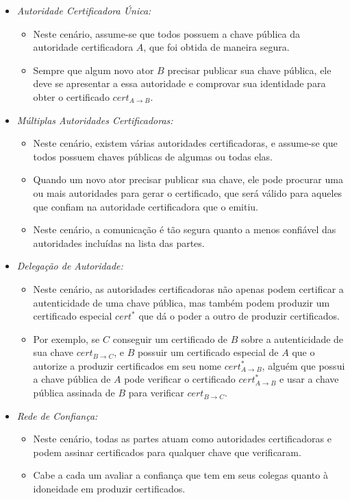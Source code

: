 \begin{itemize}
\item {\em Autoridade Certificadora Única:}
  \begin{itemize}
  \item Neste cenário, assume-se que todos possuem a chave pública da autoridade certificadora $A$, que foi obtida de maneira segura.
  \item Sempre que algum novo ator $B$ precisar publicar sua chave pública, ele deve se apresentar a essa autoridade e comprovar sua identidade para obter o certificado $cert_{A \to B}$.
  \end{itemize}
    
\item {\em Múltiplas Autoridades Certificadoras:}
  \begin{itemize}
  \item Neste cenário, existem várias autoridades certificadoras, e assume-se que todos possuem chaves públicas de algumas ou todas elas.
  \item Quando um novo ator precisar publicar sua chave, ele pode procurar uma ou mais autoridades para gerar o certificado, que será válido para aqueles que confiam na autoridade certificadora que o emitiu.
  \item Neste cenário, a comunicação é tão segura quanto a menos confiável das autoridades incluídas na lista das partes.
  \end{itemize}
    
\item {\em Delegação de Autoridade:}
  \begin{itemize}
  \item Neste cenário, as autoridades certificadoras não apenas podem certificar a autenticidade de uma chave pública, mas também podem produzir um certificado especial $cert^*$ que dá o poder a outro de produzir certificados.
  \item Por exemplo, se $C$ conseguir um certificado de $B$ sobre a autenticidade de sua chave $cert_{B \to C}$, e $B$ possuir um certificado especial de $A$ que o autorize a produzir certificados em seu nome $cert^*_{A \to B}$, alguém que possui a chave pública de $A$ pode verificar o certificado $cert^*_{A \to B}$ e usar a chave pública assinada de $B$ para verificar $cert_{B \to C}$.
  \end{itemize}
    
\item {\em Rede de Confiança:}
  \begin{itemize}
  \item Neste cenário, todas as partes atuam como autoridades certificadoras e podem assinar certificados para qualquer chave que verificaram.
  \item Cabe a cada um avaliar a confiança que tem em seus colegas quanto à idoneidade em produzir certificados.
  \end{itemize}
\end{itemize}

